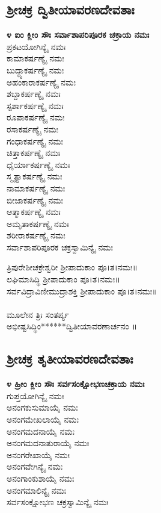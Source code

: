 \subsection{ಶ್ರೀಚಕ್ರ ದ್ವಿತೀಯಾವರಣದೇವತಾಃ}
{\bfseries ೪ ಐಂ ಕ್ಲೀಂ ಸೌಃ ಸರ್ವಾಶಾಪರಿಪೂರಕ ಚಕ್ರಾಯ ನಮಃ}\\
ಪ್ರಕಟಯೋಗಿನ್ಯೈ ನಮಃ\\
 ಕಾಮಾಕರ್ಷಣ್ಯೈ ನಮಃ\\
 ಬುದ್ಧ್ಯಾಕರ್ಷಣ್ಯೈ ನಮಃ\\
 ಅಹಂಕಾರಾಕರ್ಷಣ್ಯೈ ನಮಃ\\
 ಶಬ್ದಾಕರ್ಷಣ್ಯೈ ನಮಃ\\
 ಸ್ಪರ್ಶಾಕರ್ಷಣ್ಯೈ ನಮಃ\\
 ರೂಪಾಕರ್ಷಣ್ಯೈ ನಮಃ\\
 ರಸಾಕರ್ಷಣ್ಯೈ ನಮಃ\\
 ಗಂಧಾಕರ್ಷಣ್ಯೈ ನಮಃ\\
 ಚಿತ್ತಾಕರ್ಷಣ್ಯೈ ನಮಃ\\
 ಧೈರ್ಯಾಕರ್ಷಣ್ಯೈ ನಮಃ\\
 ಸ್ಮೃತ್ಯಾಕರ್ಷಣ್ಯೈ ನಮಃ\\
 ನಾಮಾಕರ್ಷಣ್ಯೈ ನಮಃ\\
 ಬೀಜಾಕರ್ಷಣ್ಯೈ ನಮಃ\\
 ಆತ್ಮಾಕರ್ಷಣ್ಯೈ ನಮಃ\\
 ಅಮೃತಾಕರ್ಷಣ್ಯೈ ನಮಃ\\
 ಶರೀರಾಕರ್ಷಣ್ಯೈ ನಮಃ\\
 ಸರ್ವಾಶಾಪರಿಪೂರಕ ಚಕ್ರಸ್ವಾಮಿನ್ಯೈ ನಮಃ

 ತ್ರಿಪುರೇಶೀಚಕ್ರೇಶ್ವರೀ ಶ್ರೀಪಾದುಕಾಂ ಪೂ।ತ।ನಮಃ॥\\
 ಲಘಿಮಾಸಿದ್ಧಿ ಶ್ರೀಪಾದುಕಾಂ ಪೂ।ತ।ನಮಃ॥\\
 ಸರ್ವವಿದ್ರಾವಿಣೀಮುದ್ರಾಶಕ್ತಿ ಶ್ರೀಪಾದುಕಾಂ ಪೂ।ತ।ನಮಃ॥\\
\\
ಮೂಲೇನ ತ್ರಿಃ ಸಂತರ್ಪ್ಯ\\
 ಅಭೀಷ್ಟಸಿದ್ಧಿಂ******ದ್ವಿತೀಯಾವರಣಾರ್ಚನಂ ॥
\subsection{ಶ್ರೀಚಕ್ರ ತೃತೀಯಾವರಣದೇವತಾಃ}
{\bfseries ೪ ಹ್ರೀಂ ಕ್ಲೀಂ ಸೌಃ ಸರ್ವಸಂಕ್ಷೋಭಣಚಕ್ರಾಯ ನಮಃ}\\
ಗುಪ್ತಯೋಗಿನ್ಯೈ ನಮಃ\\
 ಅನಂಗಕುಸುಮಾಯೈ ನಮಃ\\
 ಅನಂಗಮೇಖಲಾಯೈ ನಮಃ\\
 ಅನಂಗಮದನಾಯೈ ನಮಃ\\
 ಅನಂಗಮದನಾತುರಾಯೈ ನಮಃ\\
 ಅನಂಗರೇಖಾಯೈ ನಮಃ\\
 ಅನಂಗವೇಗಿನ್ಯೈ ನಮಃ\\
 ಅನಂಗಾಂಕುಶಾಯೈ ನಮಃ\\
 ಅನಂಗಮಾಲಿನ್ಯೈ ನಮಃ\\
 ಸರ್ವಸಂಕ್ಷೋಭಣ ಚಕ್ರಸ್ವಾಮಿನ್ಯೈ ನಮಃ

